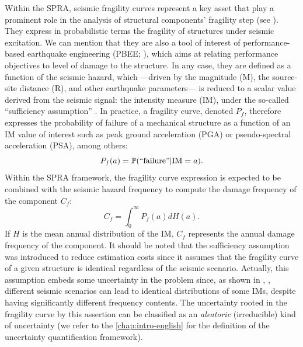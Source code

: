 Within the SPRA, seismic fragility curves represent a key asset that play a prominent role in the analysis of structural components' fragility step (see  \cite{epri_advanced_2011}).
They express in probabilistic terms the fragility of structures under seismic excitation. We can mention that they are also a tool of interest of performance-based earthquake engineering (PBEE; \cite{ghobarah_performance-based_2001,noh_development_2014}), 
which aims at relating performance objectives to level of damage to the structure.
In any case, they are defined as a function of the seismic hazard, which ---driven by the magnitude (M), the source-site distance (R), and other earthquake parameters--- is reduced to a scalar value derived from the seismic signal: the intensity measure (IM), under the so-called ``sufficiency assumption'' \citep{cornell_hazard_2004,luco_structure-specific_2007}.
In practice, a fragility curve, denoted $P_f$, therefore expresses the probability of failure of a mechanical structure as a function of an IM value of interest such as peak ground acceleration (PGA) or pseudo-spectral acceleration (PSA), among others:
    \begin{equation}
        P_f(a) = \mathbb{P}(\text{``failure''}|\text{IM}=a).
    \end{equation}
Within the SPRA framework, the fragility curve expression is expected to be combined with the seismic hazard frequency to compute the damage frequency of the component $C_f$:
    \begin{equation}
        C_f =  \int_0^\infty P_f(a)dH(a).
    \end{equation}
If $H$ is the mean annual  distribution of the IM, $C_f$ represents the annual damage frequency of the component.
It should be noted that the sufficiency assumption was introduced to reduce estimation costs since it assumes that the fragility curve of a given structure is identical regardless of the seismic scenario.
Actually, this assumption embeds some uncertainty in the problem since, as shown in \citeauthor{radu_earthquake-source-based_2018}, , %
different seismic scenarios can lead to identical distributions of some IMs, despite having significantly different frequency contents.
The uncertainty rooted in the fragility curve by this assertion can be classified as an \emph{aleatoric} (irreducible) kind of uncertainty
 (we refer to the \cref{chap:intro-english} for the definition of the uncertainty quantification framework).


